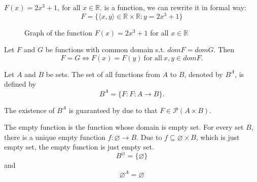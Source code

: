 \begin{example}
  $F(x) = 2x^3 + 1,\ \text{for all } x \in \mathbb{R}.$ is a
  function, we can rewrite it in formal way:
  \begin{equation*}
    F = \{\langle x,y \rangle \in \mathbb{R}\times \mathbb{R}: y = 2 x^{3} + 1\}
  \end{equation*}
\end{example}

\begin{figure}[h]
  \centering
  \caption{Graph of the function \( F(x) = 2x^3 + 1 \) for all \( x
  \in \mathbb{R} \)}
  \label{fig:graph}
\end{figure}

\begin{theorem}{}{}
  Let $F$ and $G$ be functions with common domain s.t. $domF = domG$. Then
  \[
    F = G \iff F(x) = F(y) \ \text{for all}\ x, y \in domF.
  \]
\end{theorem}

\begin{definition}{}{}
  Let $A$ and $B$ be sets. The set of all functions from $A$ to $B$,
  denoted by $B^A$, is defined by
  \[
    B^A = \{ F : F : A \to B \}.
  \]
\end{definition}

\begin{remarks}
  The existence of $B^{A}$ is guaranteed by  due to that
  $F \in \mathcal{P}(A \times B) $.
\end{remarks}

\begin{examples}
  The empty function is the function whose domain is empty set. For
  every set $B$, there is a unique empty function $f: \varnothing \to
  B$. Due to $f \subseteq \varnothing \times B$, which is just empty
  set,  the empty function is just empty set.
  \[
    B^{\varnothing} = \{\varnothing\}
  \]
  and
  \[
    \varnothing^A = \varnothing
  \]
\end{examples}

